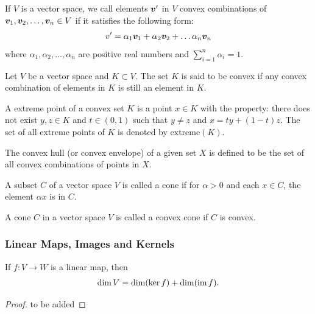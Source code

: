 \documentclass[10pt]{article}
\begin{document}
\begin{definition}
    If $V$ is a vector space, we call elements $\vb*{v}'$ in $V$ convex combinations of $\vb*{v}_1,\vb*{v}_2,\dots,\vb*{v}_n\in V$ if it satisfies the following form:
    \begin{equation}
        v'=\alpha_1 \vb*{v}_1+\alpha_2 \vb*{v}_2+\dots \alpha_n \vb*{v}_n
    \end{equation}
    where $\alpha_1,\alpha_2,\dots,\alpha_n$ are positive real numbers and $\sum_{i=1}^{n}\alpha_i=1$.
\end{definition}

\begin{definition}
    Let $V$ be a vector space and $K\subset V$.
    The set $K$ is said to be convex if any convex combination of elements in $K$ is still an element in $K$.
\end{definition}

\begin{definition}
    A extreme point of a convex set $K$ is a point $x\in K$ with the property: there does not exist $y,z\in K$ and $t\in(0,1)$ such that $y\neq z$ and $x=ty+(1-t)z$.
    The set of all extreme points of $K$ is denoted by $\text{extreme}(K)$.
\end{definition}

\begin{definition}
    The convex hull (or convex envelope) of a given set $X$ is defined to be the set of all convex combinations of points in $X$.
\end{definition}

\begin{definition}[Cone]
    A subset $C$ of a vector space $V$ is called a cone if for $\alpha>0$ and each $x\in C$, the element $\alpha x$ is in $C$.
\end{definition}

\begin{definition}
    A cone $C$ in a vector space $V$ is called a convex cone if $C$ is convex.
\end{definition}

\subsubsection{Linear Maps, Images and Kernels}
\begin{theorem}
    If $f:V\to W$ is a linear map, then
    \begin{align}
        \dim{V}=\dim(\ker{f})+\dim(\operatorname{im} f).
    \end{align}
\end{theorem}
\begin{proof}
    to be added
\end{proof}
\end{document}
